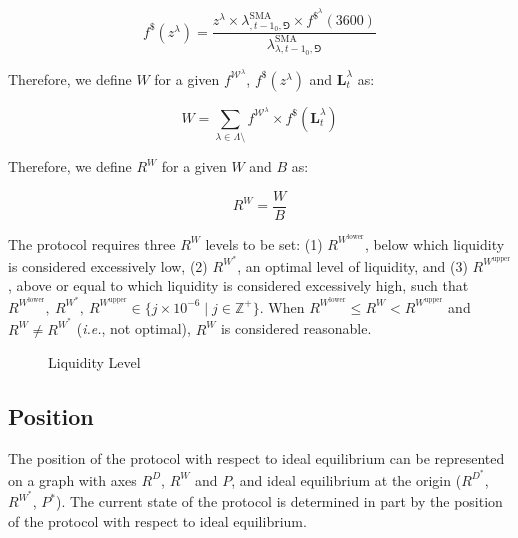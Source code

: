 \documentclass[tikz]{article}
\newcommand{\pinto}{} %
\newcommand{\nonpinto}{} %
\begin{document}
    $$
        f^{\$}(z^{\lambda}) = \frac{z^{\lambda} \times 
                                    \lambda_{\nonpinto,{t-1}_0,\Game}^{\text{SMA}} \times 
                                    f^{\$^{\lambda}}(3600)}
                                {\lambda_{\lambda,{t-1}_0,\Game}^{\text{SMA}}}
    $$

Therefore, we define $W$ for a given $f^{\mathscr{W}^{\lambda}}$, $f^{\$}(z^{\lambda})$ and $\mathbf{L}_{t}^{\lambda}$ as:

    $$
        W = \sum_{\lambda \in \Lambda \setminus \pinto} 
                    f^{\mathscr{W}^{\lambda}} \times 
                        f^{\$}(\mathbf{L}_{t}^{\lambda})
    $$

Therefore, we define $R^{W}$ for a given $W$ and $B$ as:

    $$
        R^{W} = \frac{W}{B}
    $$

\newpage 

The protocol requires three $R^{W}$ levels to be set: (1) $R^{W^{\text{lower}}}$, below which liquidity is considered excessively low, (2) $R^{W^{*}}$, an optimal level of liquidity, and (3) $R^{W^{\text{upper}}}$, above or equal to which liquidity is considered excessively high, such that $R^{W^{\text{lower}}},\ R^{W^{*}},\ R^{W^{\text{upper}}} \in \{j \times 10^{-6} \mid j \in \mathbb{Z}^{+} \}$. When $R^{W^{\text{lower}}} \leq R^{W} < R^{W^{\text{upper}}}$ and $R^{W} \neq R^{W^{*}}$ (\textit{i.e.}, not optimal), $R^{W}$ is considered reasonable.

\begin{figure}[h!]
    \centering
    
    \vspace*{-7mm}
    \setlength{\belowcaptionskip}{-8pt} %
    \caption{Liquidity Level}
    \label{Liquidity Level}
\end{figure}


\subsection{Position}

The position of the protocol with respect to ideal equilibrium can be represented on a graph with axes $R^{D}$, $R^{W}$ and $P$, and ideal equilibrium at the origin ($R^{D^{*}}$, $R^{W^{*}}$, $P^{*}$). The current state of the protocol is determined in part by the position of the protocol with respect to ideal equilibrium. 
\end{document}
